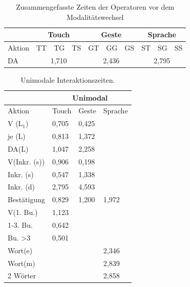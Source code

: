 \begin{table}[ht]
  \centering
	\begin{tabular}{|l|l|l|l|l|l|l|l|l|l|}
		\hline
		& \multicolumn{3}{|c|}{Touch} & \multicolumn{3}{|c|}{Geste}&\multicolumn{3}{|c|}{Sprache}\\
		\hline
		Aktion 					& TT 		& TG 		& TS 		& GT 		& GG 		& GS 		& ST 		& SG 		& SS\\
		\hline
		DA 	& \multicolumn{3}{|c|}{1,710} &	\multicolumn{3}{|c|}{2,436} 	&	\multicolumn{3}{|c|}{2,795} \\
		\hline
  \end{tabular}
	\caption{Zusammengefasste Zeiten der Operatoren vor dem Modalitätswechsel}
\label{tab:DA}
\end{table}
\begin{table}[ht]
  \centering
			\begin{tabular}{|l|l|l|l|}
					\hline
				& \multicolumn{3}{|c|}{Unimodal}\\
				\hline
				Aktion 					& Touch & Geste & Sprache \\
				\hline
				V (L$_1$) 		& {0,705} 	&	{0,425}	&	\\
				\hline
				je (L)				& {0,813} &	{1,372} &\\
				\hline
				DA(L)						& {1,047} &	{2,258} & \\
				\hline
				V(Inkr. (s))		& {0,906} &	{0,198} &\\
				\hline
				Inkr. (s)			& {0,547} &	{1,338} &\\
				\hline
				Inkr. (d)					& {2,795} &	4,593 & \\
				\hline
				Bestätigung 		& {0,829} &{1,200} & {1,972}\\
				\hline
				V(1. Bu.)					& {1,123} 	& 	&\\
				\hline
				1-3. Bu.					& {0,642} & 	& \\
				\hline
				Bu. >3 					& {0,501}		&  	& \\
				\hline
				Wort(e)					& & & {2,346} \\
				\hline
				Wort(m) 				& & & {2,839}\\
				\hline
				2 Wörter 				& & & {2,858}\\
				\hline
			\end{tabular}
	\caption{Unimodale Interaktionszeiten.}
	\label{tab:AktionenUnimodal}
\end{table}

